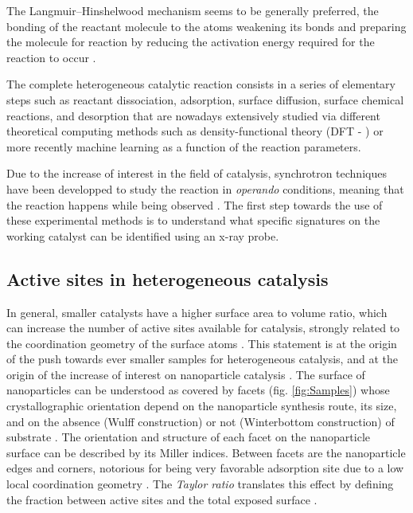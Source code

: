 
The Langmuir–Hinshelwood mechanism seems to be generally preferred, the bonding of the reactant molecule to the atoms weakening its bonds and preparing the molecule for reaction by reducing the activation energy required for the reaction to occur \parencite{Baxter2002}.

The complete heterogeneous catalytic reaction consists in a series of elementary steps such as reactant dissociation, adsorption, surface diffusion, surface chemical reactions, and desorption that are nowadays extensively studied via different theoretical computing methods such as density-functional theory (DFT - \cite{Reuter2004, Molenbroek2009, Yawei2015, Gaggioli2019, Chatelier2020}) or more recently machine learning \parencite{Kitchin2018, Schlexer2019, Anstine2023} as a function of the reaction parameters.

Due to the increase of interest in the field of catalysis, synchrotron techniques have been developped to study the reaction in \textit{operando} conditions, meaning that the reaction happens while being observed \parencite{Meirer2018}.
The first step towards the use of these experimental methods is to understand what specific signatures on the working catalyst can be identified using an x-ray probe.

\subsection{Active sites in heterogeneous catalysis}

In general, smaller catalysts have a higher surface area to volume ratio, which can increase the number of active sites available for catalysis, strongly related to the coordination geometry of the surface atoms \parencite{Vogt2022}.
This statement is at the origin of the push towards ever smaller samples for heterogeneous catalysis, and at the origin of the increase of interest on nanoparticle catalysis \parencite{CHE1989, Molenbroek2009, Schauermann2013}.
The surface of nanoparticles can be understood as covered by facets (fig. \ref{fig:Samples}) whose crystallographic orientation depend on the nanoparticle synthesis route, its size, and on the absence (Wulff construction) or not (Winterbottom construction) of substrate \parencite{Boukouvala2021}.
The orientation and structure of each facet on the nanoparticle surface can be described by its Miller indices.
Between facets are the nanoparticle edges and corners, notorious for being very favorable adsorption site due to a low local coordination geometry \parencite{Jiang2009, CalleVallejo2014, CalleVallejo2018}.
The \textit{Taylor ratio} translates this effect by defining the fraction between active sites and the total exposed surface \parencite{Taylor1925}.

